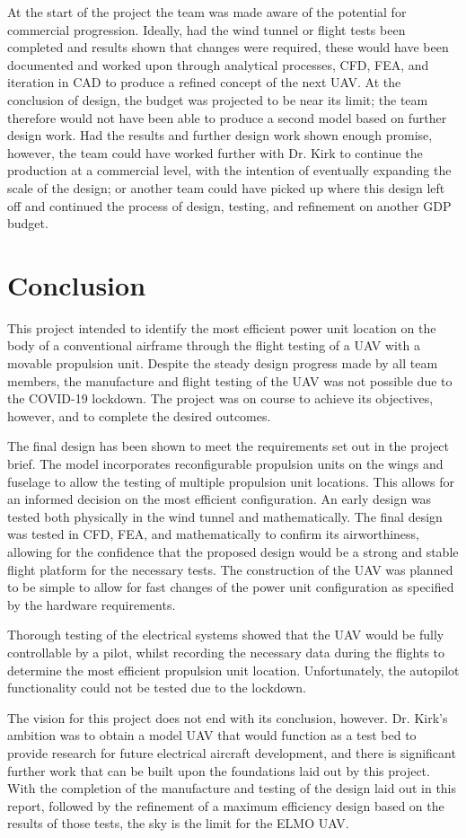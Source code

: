 \documentclass[../../main.tex]{subfiles}
\begin{document}
At the start of the project the team was made aware of the potential for commercial progression.
Ideally, had the wind tunnel or flight tests been completed and results shown that changes were required, these would have been documented and worked upon through analytical processes, CFD, FEA, and iteration in CAD to produce a refined concept of the next UAV.
At the conclusion of design, the budget was projected to be near its limit; the team therefore would not have been able to produce a second model based on further design work.
Had the results and further design work shown enough promise, however, the team could have worked further with Dr. Kirk to continue the production at a commercial level, with the intention of eventually expanding the scale of the design; or another team could have picked up where this design left off and continued the process of design, testing, and refinement on another GDP budget. 

\section{Conclusion} \label{sec:project-review:conclusion}

This project intended to identify the most efficient power unit location on the body of a conventional airframe through the flight testing of a UAV with a movable propulsion unit.
Despite the steady design progress made by all team members, the manufacture and flight testing of the UAV was not possible due to the COVID-19 lockdown.
The project was on course to achieve its objectives, however, and to complete the desired outcomes.  

The final design has been shown to meet the requirements set out in the project brief.
The model incorporates reconfigurable propulsion units on the wings and fuselage to allow the testing of multiple propulsion unit locations.
This allows for an informed decision on the most efficient configuration.
An early design was tested both physically in the wind tunnel and mathematically.
The final design was tested in CFD, FEA, and mathematically to confirm its airworthiness, allowing for the confidence that the proposed design would be a strong and stable flight platform for the necessary tests.
The construction of the UAV was planned to be simple to allow for fast changes of the power unit configuration as specified by the hardware requirements. 

Thorough testing of the electrical systems showed that the UAV would be fully controllable by a pilot, whilst recording the necessary data during the flights to determine the most efficient propulsion unit location.
Unfortunately, the autopilot functionality could not be tested due to the lockdown.  

The vision for this project does not end with its conclusion, however.
Dr. Kirk's ambition was to obtain a model UAV that would function as a test bed to provide research for future electrical aircraft development, and there is significant further work that can be built upon the foundations laid out by this project.
With the completion of the manufacture and testing of the design laid out in this report, followed by the refinement of a maximum efficiency design based on the results of those tests, the sky is the limit for the ELMO UAV. 
\end{document}
